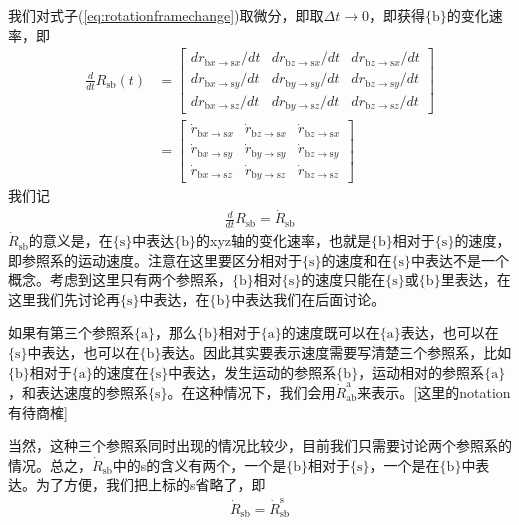 \documentclass[12pt, a4paper, article, UTF8]{ctexart}
\begin{document}
我们对式子(\ref{eq:rotationframechange})取微分，即取$\Delta t\rightarrow 0$，即获得$\{\text{b}\}$的变化速率，即
\begin{align}
\frac{d}{dt}R_\text{sb}(t) &= \begin{bmatrix}
 dr_{\text{b}x\rightarrow\text{s}x}/dt &  dr_{\text{b}z\rightarrow\text{s}x}/dt &  dr_{\text{b}z\rightarrow\text{s}x}/dt\\
 dr_{\text{b}x\rightarrow\text{s}y}/dt &  dr_{\text{b}y\rightarrow\text{s}y}/dt &  dr_{\text{b}z\rightarrow\text{s}y}/dt\\
 dr_{\text{b}x\rightarrow\text{s}z}/dt &  dr_{\text{b}y\rightarrow\text{s}z}/dt &  dr_{\text{b}z\rightarrow\text{s}z}/dt
\end{bmatrix} \nonumber\\
 &= \begin{bmatrix}
 \dot{r}_{\text{b}x\rightarrow\text{s}x} &  \dot{r}_{\text{b}z\rightarrow\text{s}x} &  \dot{r}_{\text{b}z\rightarrow\text{s}x}\\
 \dot{r}_{\text{b}x\rightarrow\text{s}y} &  \dot{r}_{\text{b}y\rightarrow\text{s}y} &  \dot{r}_{\text{b}z\rightarrow\text{s}y}\\
 \dot{r}_{\text{b}x\rightarrow\text{s}z} &  \dot{r}_{\text{b}y\rightarrow\text{s}z} &  \dot{r}_{\text{b}z\rightarrow\text{s}z}
\end{bmatrix} \label{eq:rotationmatrixrateofchange}
\end{align}
我们记
\begin{align}
\frac{d}{dt}R_\text{sb} = \dot{R}_\text{sb}
\end{align}
$\dot{R}_\text{sb}$的意义是，在$\{\text{s}\}$中表达$\{\text{b}\}$的xyz轴的变化速率，也就是$\{\text{b}\}$相对于$\{\text{s}\}$的速度，即参照系的运动速度。注意在这里要区分相对于$\{\text{s}\}$的速度和在$\{\text{s}\}$中表达不是一个概念。考虑到这里只有两个参照系，$\{\text{b}\}$相对$\{\text{s}\}$的速度只能在$\{\text{s}\}$或$\{\text{b}\}$里表达，在这里我们先讨论再$\{\text{s}\}$中表达，在$\{\text{b}\}$中表达我们在后面讨论。

如果有第三个参照系$\{\text{a}\}$，那么$\{\text{b}\}$相对于$\{\text{a}\}$的速度既可以在$\{\text{a}\}$表达，也可以在$\{\text{s}\}$中表达，也可以在$\{\text{b}\}$表达。因此其实要表示速度需要写清楚三个参照系，比如$\{\text{b}\}$相对于$\{\text{a}\}$的速度在$\{\text{s}\}$中表达，发生运动的参照系$\{\text{b}\}$，运动相对的参照系$\{\text{a}\}$，和表达速度的参照系$\{\text{s}\}$。在这种情况下，我们会用$\dot{R}_\text{ab}^{\text{a}}$来表示。[这里的notation有待商榷]

当然，这种三个参照系同时出现的情况比较少，目前我们只需要讨论两个参照系的情况。总之，$\dot{R}_\text{sb}$中的s的含义有两个，一个是$\{\text{b}\}$相对于$\{\text{s}\}$，一个是在$\{\text{b}\}$中表达。为了方便，我们把上标的s省略了，即
\begin{align}
\dot{R}_\text{sb} = \dot{R}_\text{sb}^\text{s} \label{eq:threeframerotationrepresentation}
\end{align}
\end{document}
